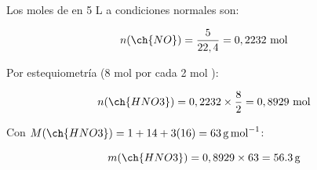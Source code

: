 \begin{exerciseEVAU}
\begin{solu}
        Los moles de  en 5 L a condiciones normales son:

        \begin{equation*}
            n(\ch{NO}) = \dfrac{5}{22,4} = 0,2232 \ \text{mol}
        \end{equation*}

        Por estequiometría (8 mol  por cada 2 mol ):

        \begin{equation*}
            n(\ch{HNO3}) = 0,2232 \times \dfrac{8}{2} = 0,8929 \ \text{mol}
        \end{equation*}

        Con \(M(\ch{HNO3}) = 1+14+3(16) = \SI{63}{\gram\per\mole}\):

        \begin{equation*}
            m(\ch{HNO3}) = 0,8929 \times 63 = \SI{56.3}{\gram}
        \end{equation*}

    \end{solu}
\end{exerciseEVAU}

